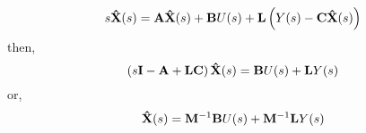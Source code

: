 \[
s{\bf{\hat X}}(s) =  {\bf{A\hat X}}(s) + {\bf{B}}U(s) + {\bf{L}}\left( {Y(s) - {\bf{C\hat X}}}(s) \right)
\]
then,
\[
\left( {s{\bf{I}} - {\bf{A}} + {\bf{LC}}} \right){\bf{\hat X}}(s) = {\bf{B}}U(s) + {\bf{L}}Y(s) 
\]
or,
\[
{\bf{\hat X}}(s) = {\bf{M}}^{ - 1} {\bf{B}}U(s) + {\bf{M}}^{ - 1} {\bf{L}}Y(s)
\]


\endinput

